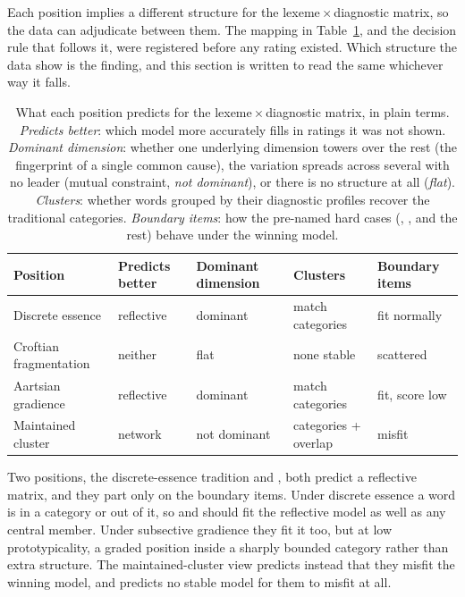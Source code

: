 \documentclass[12pt]{article}
\begin{document}
Each position implies a different structure for the
lexeme\,$\times$\,diagnostic matrix, so the data can adjudicate between them.
The mapping in Table~\ref{tab:predictions}, and the decision rule that follows
it, were registered before any rating existed. Which structure the data show is
the finding, and this section is written to read the same whichever way it
falls.

\begin{table}[t]
\centering\small
\caption{What each position predicts for the lexeme\,$\times$\,diagnostic
matrix, in plain terms. \emph{Predicts better}: which model more accurately fills
in ratings it was not shown. \emph{Dominant dimension}: whether one underlying
dimension towers over the rest (the fingerprint of a single common cause), the
variation spreads across several with no leader (mutual constraint,
\emph{not dominant}), or there is no structure at all (\emph{flat}).
\emph{Clusters}: whether words grouped by their diagnostic profiles recover the
traditional categories. \emph{Boundary items}: how the pre-named hard cases
(, , and the rest) behave under the winning model.}
\label{tab:predictions}
\begin{tabular}{@{}lllll@{}}
\toprule
Position & Predicts better & Dominant dimension & Clusters & Boundary items \\
\midrule
Discrete essence & reflective & dominant & match categories & fit normally \\
Croftian fragmentation & neither & flat & none stable & scattered \\
Aartsian gradience & reflective & dominant & match categories & fit, score low \\
Maintained cluster & network & not dominant & categories + overlap & misfit \\
\bottomrule
\end{tabular}
\end{table}

Two positions, the discrete-essence tradition and \textcite{aarts2007}, both
predict a reflective matrix, and they part only on the boundary items. Under
discrete essence a word is in a category or out of it, so  and
 should fit the reflective model as well as any central member.
Under subsective gradience they fit it too, but at low prototypicality, a graded
position inside a sharply bounded category rather than extra structure. The
maintained-cluster view predicts instead that they misfit the winning model, and
\textcite{croft2001} predicts no stable model for them to misfit at all.
\end{document}
